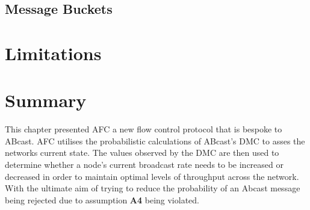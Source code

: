     \subsection*{Message Buckets}
\section{Limitations}

\section{Summary}
This chapter presented AFC a new flow control protocol that is bespoke to \textsf{ABcast}.  AFC utilises the probabilistic calculations of \textsf{ABcast}'s DMC to asses the networks current state.  The values observed by the DMC are then used to determine whether a node's current broadcast rate needs to be increased or decreased in order to maintain optimal levels of throughput across the network.  With the ultimate aim of trying to reduce the probability of an \textsf{Abcast} message being rejected due to assumption \textbf{A4} being violated.    